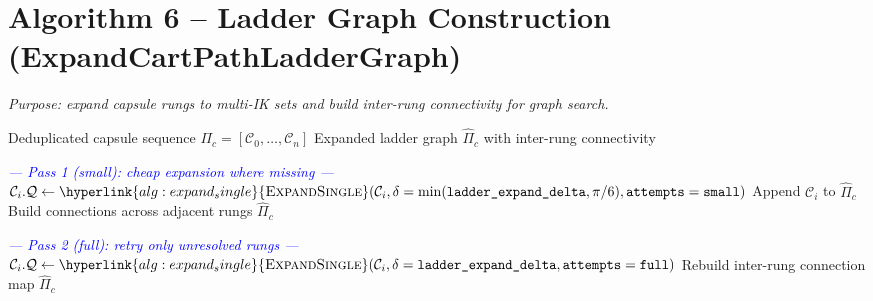 \documentclass[11pt]{article}
\newcommand{\chg}[1]{\textcolor{blue}{#1}}
\newcommand{\AlgTarget}[1]{\hypertarget{#1}{}}
\newcommand{\AlgLink}[2]{\hyperlink{#1}{#2}}
\begin{document}
\section*{Algorithm 6 -- Ladder Graph Construction (ExpandCartPathLadderGraph)}
\noindent\textit{Purpose: expand capsule rungs to multi-IK sets and build inter-rung connectivity for graph search.}
\AlgTarget{alg:expand_cart_path_ladder_graph}
\begin{algorithm}[H]
\caption{\textsc{ExpandCartPathLadderGraph}($\Pi_c$)}
\begin{algorithmic}[1]
\Require Deduplicated capsule sequence $\Pi_c = [\mathcal{C}_0, \ldots, \mathcal{C}_n]$
\Ensure  Expanded ladder graph $\hat{\Pi}_c$ with inter-rung connectivity

\State \chg{\textit{--- Pass 1 (small): cheap expansion where missing ---}}
    \State \chg{$\mathcal{C}_i.\mathcal{Q} \gets \AlgLink{alg:expand_single}{\textsc{ExpandSingle}}(\mathcal{C}_i,\delta=\min(\texttt{ladder\_expand\_delta},\pi/6),\texttt{attempts}=\texttt{small})$}
  \EndIf
  \State Append $\mathcal{C}_i$ to $\hat{\Pi}_c$
\EndFor
\State Build connections across adjacent rungs
\If{\chg{at least one inter-rung edge exists}} \Return $\hat{\Pi}_c$ \EndIf

\State \chg{\textit{--- Pass 2 (full): retry only unresolved rungs ---}}
    \State \chg{$\mathcal{C}_i.\mathcal{Q} \gets \AlgLink{alg:expand_single}{\textsc{ExpandSingle}}(\mathcal{C}_i,\delta=\texttt{ladder\_expand\_delta},\texttt{attempts}=\texttt{full})$}
  \EndIf
\EndFor
\State Rebuild inter-rung connection map
\State \Return $\hat{\Pi}_c$
\end{algorithmic}
\end{algorithm}

\end{document}
